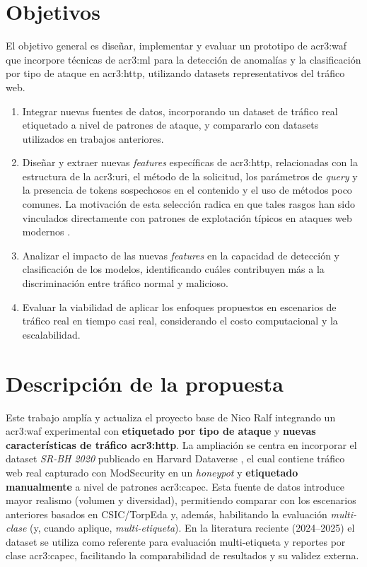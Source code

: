 \section{Objetivos}

El objetivo general es diseñar, implementar y evaluar un prototipo de
\gls{acr3:waf} que incorpore técnicas de \gls{acr3:ml} para la detección de
anomalías y la clasificación por tipo de ataque en \gls{acr3:http}, utilizando
datasets representativos del tráfico web.

\begin{enumerate}
  \item Integrar nuevas fuentes de datos, incorporando un dataset de tráfico real
        etiquetado a nivel de patrones de ataque, y compararlo con datasets
        utilizados en trabajos anteriores.
  \item Diseñar y extraer nuevas \textit{features} específicas de \gls{acr3:http},
        relacionadas con la estructura de la \gls{acr3:uri}, el método de la
        solicitud, los parámetros de \textit{query} y la presencia de tokens
        sospechosos en el contenido y el uso de métodos poco comunes.
        La motivación de esta selección radica en que tales rasgos han sido vinculados
        directamente con patrones de explotación típicos en ataques web modernos
        \cite{nguyen2011application}.
  \item Analizar el impacto de las nuevas \textit{features}
        en la capacidad de detección y clasificación de los modelos,
        identificando cuáles contribuyen más a la discriminación
        entre tráfico normal y malicioso.
  \item Evaluar la viabilidad de aplicar los enfoques
        propuestos en escenarios de tráfico real en tiempo
        casi real, considerando el costo computacional y la
        escalabilidad.
\end{enumerate}

\section{Descripción de la propuesta}

Este trabajo amplía y actualiza el proyecto base de Nico Ralf \cite{gimenez2015tfg} integrando un \gls{acr3:waf} experimental con \textbf{etiquetado por tipo de ataque} y \textbf{nuevas características de tráfico \gls{acr3:http}}. La ampliación se centra en incorporar el dataset \textit{SR-BH 2020} publicado en Harvard Dataverse \cite{harvard2020dataset}, el cual contiene tráfico web real capturado con ModSecurity en un \textit{honeypot} y \textbf{etiquetado manualmente} a nivel de patrones \gls{acr3:capec}. Esta fuente de datos introduce mayor realismo (volumen y diversidad), permitiendo comparar con los escenarios anteriores basados en CSIC/TorpEda y, además, habilitando la evaluación \emph{multi-clase} (y, cuando aplique, \emph{multi-etiqueta}). En la literatura reciente (2024–2025) el dataset se utiliza como referente para evaluación multi-etiqueta y reportes por clase \gls{acr3:capec}, facilitando la comparabilidad de resultados y su validez externa.\footnotesize\footnotemark
{}

